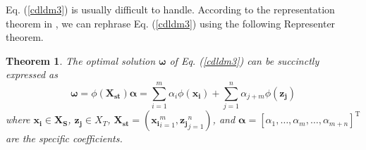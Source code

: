 \documentclass[a4paper]{cas-sc}
\newtheorem{myTheo}{Theorem}
\begin{document}
Eq. (\ref{cdldm3}) is usually difficult to handle. According to the representation theorem in \cite{belkin2006manifold}, we can rephrase Eq. (\ref{cdldm3}) using the following Representer theorem.


\begin{myTheo}\label{theo1}
 The optimal solution $\boldsymbol{\omega}$ of Eq. (\ref{cdldm3}) can be succinctly expressed as 
\begin{equation}\label{omega}
\boldsymbol{\omega} = \phi(\boldsymbol{X_{st}})\boldsymbol{\alpha} = \sum_{i=1}^m \alpha_i \phi(\boldsymbol{x_i}) + \sum_{j=1}^n \alpha_{j+m} \phi(\boldsymbol{z_j})
\end{equation}
where $\boldsymbol{x_i} \in \boldsymbol{X_S}$, $\boldsymbol{z_j} \in X_T$, $\boldsymbol{X_{st}} = ({\boldsymbol{x_i}}_{i=1}^m,{\boldsymbol{z_j}}_{j=1}^n)$, and $\boldsymbol{\alpha} = [\alpha_1,\ldots,\alpha_m,\ldots,\alpha_{m+n}]^{\mathrm{T}}$ are the specific coefficients.
\end{myTheo}
\end{document}

